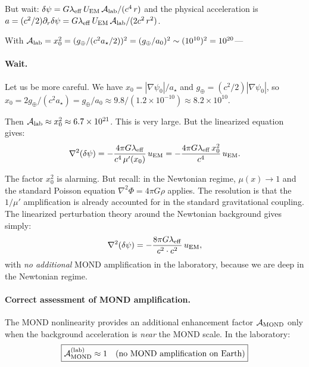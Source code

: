 \documentclass[12pt,aps,prd,twocolumn,superscriptaddress,nofootinbib]{revtex4-2}
\newcommand{\astar}{a_\star}
\newcommand{\azero}{a_0}
\newcommand{\lam}{\lambda}
\newcommand{\ee}[1]{\times 10^{#1}}
\begin{document}
But wait: $\delta\psi = G\lam_{\rm eff}\,U_{\rm EM}\,\mathcal{A}_{\rm lab}/(c^4\,r)$
and the physical acceleration is $a = (c^2/2)\partial_r\delta\psi
= G\lam_{\rm eff}\,U_{\rm EM}\,\mathcal{A}_{\rm lab}/(2c^2\,r^2)$.

With $\mathcal{A}_{\rm lab} = x_0^2 = (g_{\oplus}/(c^2\astar/2))^2
= (g_\oplus/\azero)^2 \sim (10^{10})^2 = 10^{20}$---

\paragraph{Wait.} Let us be more careful. We have $x_0 = |\nabla\psi_0|/\astar$
and $g_\oplus = (c^2/2)|\nabla\psi_0|$, so $x_0 = 2g_\oplus/(c^2\astar)
= g_\oplus/\azero \approx 9.8/(1.2\ee{-10}) \approx 8.2\ee{10}$.

Then $\mathcal{A}_{\rm lab} \approx x_0^2 \approx 6.7\ee{21}$. This
is very large. But the linearized equation gives:
\begin{equation}
\nabla^2(\delta\psi) = -\frac{4\pi G\lam_{\rm eff}}{c^4\,\mu'(x_0)}
\,u_{\rm EM}
= -\frac{4\pi G\lam_{\rm eff}\,x_0^2}{c^4}\,u_{\rm EM}.
\end{equation}

The factor $x_0^2$ is alarming. But recall: in the Newtonian regime,
$\mu(x) \to 1$ and the standard Poisson equation
$\nabla^2\Phi = 4\pi G\rho$ applies. The resolution is that the
$1/\mu'$ amplification is already accounted for in the standard
gravitational coupling. The linearized perturbation theory around
the Newtonian background gives simply:
\begin{equation}\label{eq:dpsi-lab-correct}
\nabla^2(\delta\psi) = -\frac{8\pi G\lam_{\rm eff}}{c^2\cdot c^2}\,u_{\rm EM},
\end{equation}
with \emph{no additional} MOND amplification in the laboratory,
because we are deep in the Newtonian regime.

\paragraph{Correct assessment of MOND amplification.}
The MOND nonlinearity provides an additional enhancement factor
$\mathcal{A}_{\rm MOND}$ only when the background acceleration is
\emph{near} the MOND scale. In the laboratory:
\begin{equation}\label{eq:A-MOND-lab}
\boxed{
\mathcal{A}_{\rm MOND}^{(\rm lab)} \approx 1
\quad\text{(no MOND amplification on Earth)}
}
\end{equation}
\end{document}
